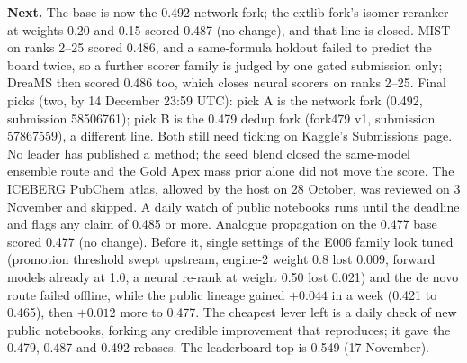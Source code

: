 \documentclass[11pt]{article}
\begin{document}
\textbf{Next.} The base is now the 0.492 network fork; the extlib fork's isomer reranker at weights 0.20 and 0.15 scored 0.487 (no change), and that line is closed. MIST on ranks 2--25 scored 0.486, and a same-formula holdout failed to predict the board twice, so a further scorer family is judged by one gated submission only; DreaMS then scored 0.486 too, which closes neural scorers on ranks 2--25. Final picks (two, by 14
December 23:59 UTC): pick A is the network fork (0.492, submission 58506761); pick B is the 0.479 dedup fork
(fork479 v1, submission 57867559), a different line. Both still need ticking on Kaggle's Submissions page. No leader has published a method; the seed blend closed the same-model
ensemble route and the Gold Apex mass prior alone did not move the score. The ICEBERG PubChem atlas, allowed by the host on 28 October, was reviewed on 3 November and skipped.
A daily watch of public notebooks runs until the deadline and flags any claim of 0.485 or more. Analogue propagation on the 0.477 base scored 0.477 (no change). Before it, single settings of the E006 family look tuned
(promotion threshold swept upstream, engine-2 weight 0.8 lost 0.009, forward models already at 1.0, a neural re-rank at
weight 0.50 lost 0.021) and the de novo route failed offline, while the public lineage gained $+0.044$ in a week (0.421 to
0.465), then $+0.012$ more to 0.477. The cheapest lever left is a daily check of new public notebooks,
forking any credible improvement that reproduces; it gave the 0.479, 0.487 and 0.492 rebases. The leaderboard top is 0.549 (17 November).
\end{document}
